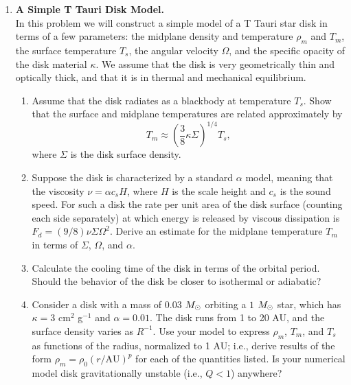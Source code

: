 \begin{enumerate}
\item {\bf A Simple T Tauri Disk Model.}\\
In this problem we will construct a simple model of a T Tauri star disk in terms of a few parameters: the midplane density and temperature $\rho_m$ and $T_m$, the surface temperature $T_s$, the angular velocity $\Omega$, and the specific opacity of the disk material $\kappa$. We assume that the disk is very geometrically thin and optically thick, and that it is in thermal and mechanical equilibrium.
\begin{enumerate}
\item Assume that the disk radiates as a blackbody at temperature $T_s$. Show that the surface and midplane temperatures are related approximately by
\begin{displaymath}
T_m \approx \left(\frac{3}{8}\kappa\Sigma\right)^{1/4} T_s,
\end{displaymath}
where $\Sigma$ is the disk surface density.
\item Suppose the disk is characterized by a standard $\alpha$ model, meaning that the viscosity $\nu=\alpha c_s H$, where $H$ is the scale height and $c_s$ is the sound speed. For such a disk the rate per unit area of the disk surface (counting each side separately) at which energy is released by viscous dissipation is $F_d=(9/8) \nu \Sigma \Omega^2$. Derive an estimate for the midplane temperature $T_m$ in terms of $\Sigma$, $\Omega$, and $\alpha$.
\item Calculate the cooling time of the disk in terms of the orbital period. Should the behavior of the disk be closer to isothermal or adiabatic?
\item Consider a disk with a mass of $0.03$ $M_{\odot}$ orbiting a $1$ $M_{\odot}$ star, which has $\kappa=3$ cm$^2$ g$^{-1}$ and $\alpha=0.01$. The disk runs from 1 to 20 AU, and the surface density varies as $R^{-1}$. Use your model to express $\rho_m$, $T_m$, and $T_s$ as functions of the radius, normalized to 1 AU; i.e., derive results of the form $\rho_m = \rho_0 (r/\mathrm{AU})^p$ for each of the quantities listed. Is your numerical model disk gravitationally unstable (i.e., $Q<1$) anywhere?
\end{enumerate}

\end{enumerate}
